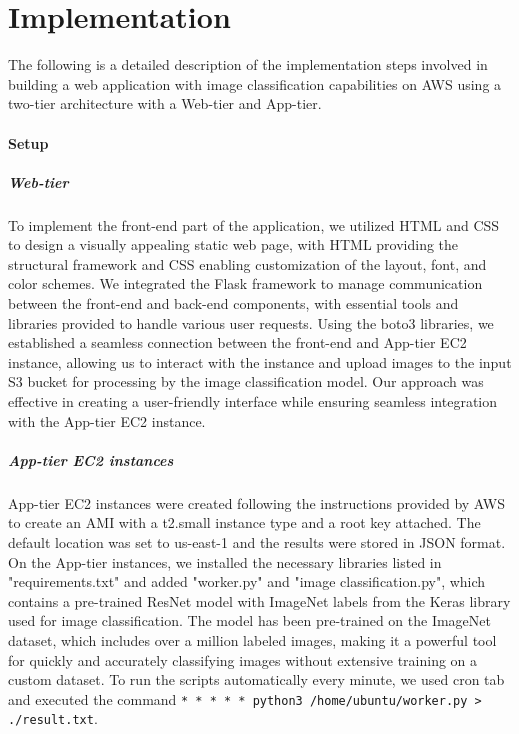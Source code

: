 \documentclass[../main.tex]{subfiles}
\begin{document}
\part*{Implementation}
The following is a detailed description of the implementation steps involved in building a web application with image classification capabilities on AWS using a two-tier architecture with a Web-tier and App-tier.
\subsection*{Setup}

\subsubsection*{Web-tier}
To implement the front-end part of the application, we utilized HTML and CSS to design a visually appealing static web page, with HTML providing the structural framework and CSS enabling customization of the layout, font, and color schemes. We integrated the Flask framework to manage communication between the front-end and back-end components, with essential tools and libraries provided to handle various user requests. Using the boto3 libraries, we established a seamless connection between the front-end and App-tier EC2 instance, allowing us to interact with the instance and upload images to the input S3 bucket for processing by the image classification model. Our approach was effective in creating a user-friendly interface while ensuring seamless integration with the App-tier EC2 instance.

\subsubsection*{App-tier EC2 instances}
App-tier EC2 instances were created following the instructions \citet{ec2} provided by AWS to create an AMI with a t2.small instance type and a root key attached. The default location was set to us-east-1 and the results were stored in JSON format. On the App-tier instances, we installed the necessary libraries listed in "requirements.txt" and added "worker.py" and "image classification.py", which contains a pre-trained ResNet model with ImageNet labels from the Keras library used for image classification. The model has been pre-trained on the ImageNet dataset, which includes over a million labeled images, making it a powerful tool for quickly and accurately classifying images without extensive training on a custom dataset. To run the scripts automatically every minute, we used cron tab and executed the command \texttt{* * * * * python3 /home/ubuntu/worker.py > ./result.txt}.
\end{document}
